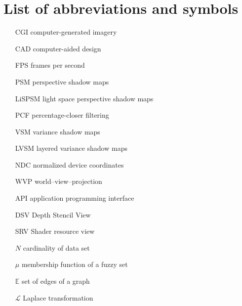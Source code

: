 \chapter{List of abbreviations and symbols}

\begin{itemize}
\item[CGI] computer-generated imagery
\item[CAD] computer-aided design
\item[FPS] frames per second
\item[PSM] perspective shadow maps
\item[LiSPSM] light space perspective shadow maps
\item[PCF] percentage-closer filtering
\item[VSM] variance shadow maps
\item[LVSM] layered variance shadow maps

\item[NDC] normalized device coordinates
\item[WVP] world--view--projection
\item[API] application programming interface
\item[DSV] Depth Stencil View
\item[SRV] Shader resource view

\item[$N$] cardinality of data set
\item[$\mu$] membership function of a fuzzy set
\item[$\mathbb{E}$] set of edges of a graph
\item[$\mathcal{L}$] Laplace transformation
\end{itemize}